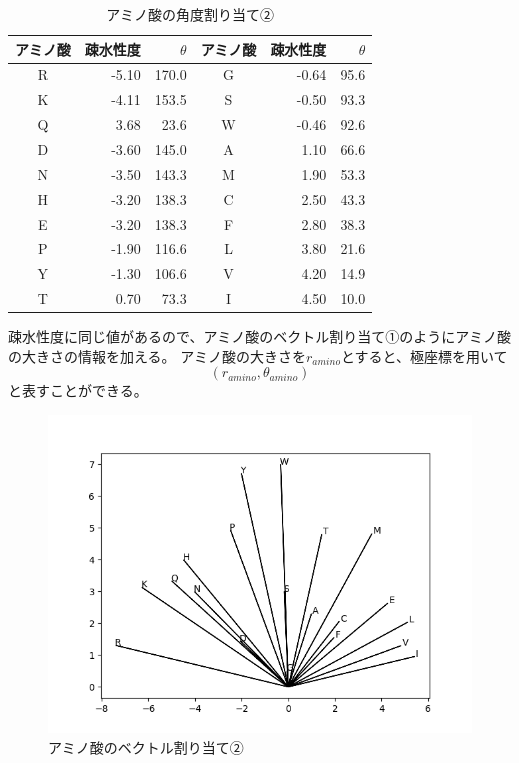 \documentclass[dvipdfmx]{beamer}
\begin{document}
  \begin{frame}
    \begin{table}[H]
      \centering
      \caption{アミノ酸の角度割り当て②}
      \label{tab:amino_theta}
      \begin{tabular}{crrcrr}
        \toprule
        アミノ酸 & 疎水性度 & $\theta$ & アミノ酸 & 疎水性度 & $\theta$ \\
        \midrule
        R & -5.10 & 170.0 & G & -0.64 & 95.6 \\
        K & -4.11 & 153.5 & S & -0.50 & 93.3 \\
        Q & 3.68 & 23.6 & W & -0.46 & 92.6 \\
        D & -3.60 & 145.0 & A & 1.10 & 66.6 \\
        N & -3.50 & 143.3 & M & 1.90 & 53.3 \\
        H & -3.20 & 138.3 & C & 2.50 & 43.3 \\
        E & -3.20 & 138.3 & F & 2.80 & 38.3 \\
        P & -1.90 & 116.6 & L & 3.80 & 21.6 \\
        Y & -1.30 & 106.6 & V & 4.20 & 14.9 \\
        T & 0.70 & 73.3 & I & 4.50 & 10.0 \\
        \bottomrule
      \end{tabular}
    \end{table}
  \end{frame}

  \begin{frame}
    疎水性度に同じ値があるので、アミノ酸のベクトル割り当て①のようにアミノ酸の大きさの情報を加える。
    アミノ酸の大きさを\(r_{amino}\)とすると、極座標を用いて
    \begin{equation}
      (r_{amino}, \theta_{amino})
    \end{equation}
    と表すことができる。
  \end{frame}

  \begin{frame}
    \begin{figure}[H]
      \centering
      \includegraphics[keepaspectratio, scale=0.6]{images/my_amino_vector.png}
      \caption{アミノ酸のベクトル割り当て②}
      \label{fig:my_amino_vector}
    \end{figure}
  \end{frame}
\end{document}
